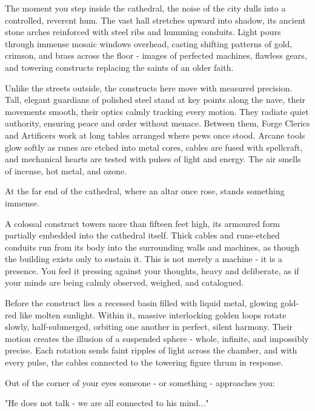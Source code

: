\begin{DndReadAloud}
	The moment you step inside the cathedral, the noise of the city dulls into a controlled, reverent hum. The vast hall stretches upward into shadow, its ancient stone arches reinforced with steel ribs and humming conduits. Light pours through immense mosaic windows overhead, casting shifting patterns of gold, crimson, and brass across the floor - images of perfected machines, flawless gears, and towering constructs replacing the saints of an older faith.

	Unlike the streets outside, the constructs here move with measured precision. Tall, elegant guardians of polished steel stand at key points along the nave, their movements smooth, their optics calmly tracking every motion. They radiate quiet authority, ensuring peace and order without menace. Between them, Forge Clerics and Artificers work at long tables arranged where pews once stood. Arcane tools glow softly as runes are etched into metal cores, cables are fused with spellcraft, and mechanical hearts are tested with pulses of light and energy. The air smells of incense, hot metal, and ozone.

	At the far end of the cathedral, where an altar once rose, stands something immense.

	A colossal construct towers more than fifteen feet high, its armoured form partially embedded into the cathedral itself. Thick cables and rune-etched conduits run from its body into the surrounding walls and machines, as though the building exists only to sustain it. This is not merely a machine - it is a presence. You feel it pressing against your thoughts, heavy and deliberate, as if your minds are being calmly observed, weighed, and catalogued.

	Before the construct lies a recessed basin filled with liquid metal, glowing gold-red like molten sunlight. Within it, massive interlocking golden loops rotate slowly, half-submerged, orbiting one another in perfect, silent harmony. Their motion creates the illusion of a suspended sphere - whole, infinite, and impossibly precise. Each rotation sends faint ripples of light across the chamber, and with every pulse, the cables connected to the towering figure thrum in response.

	Out of the corner of your eyes someone - or something - approaches you:

	"He does not talk - we are all connected to his mind..."
\end{DndReadAloud}
\vfill\eject
